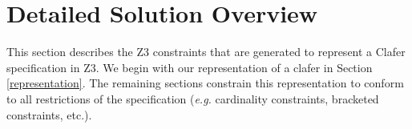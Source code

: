 \documentclass{easychair}
\newcommand{\eg}{\emph{e.g.}\xspace}
\begin{document}



\section{Detailed Solution Overview}
\label{detailedsolution}
This section describes the Z3 constraints that are generated to represent a Clafer specification in Z3. We begin with our representation of a clafer in Section \ref{representation}. The remaining sections constrain this representation to conform to all restrictions of the specification (\eg cardinality constraints, bracketed constraints, etc.).
\end{document}

